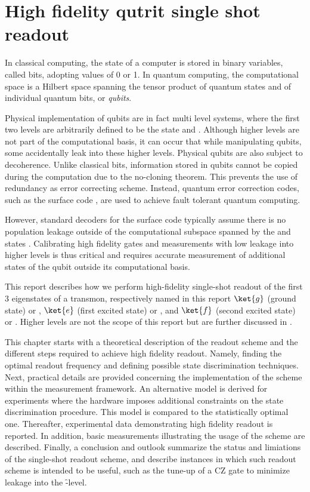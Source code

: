 \chapter{High fidelity qutrit single shot readout} \label{ch:qutrit_readout}
In classical computing, the state of a computer is stored in binary variables, called bits, adopting values of 0 or 1. In quantum computing, the computational space is a Hilbert space spanning the tensor product of quantum states \0 and \1 of individual quantum bits, or \textit{qubits}. 

Physical implementation of qubits are in fact multi level systems, where the first two levels are arbitrarily defined to be the state \0 and \1. Although higher levels are not part of the computational basis, it can occur that while manipulating qubits, some accidentally leak into these higher levels. Physical qubits are also subject to decoherence. Unlike classical bits, information stored in qubits cannot be copied during the computation due to the no-cloning theorem. This prevents the use of redundancy as error correcting scheme. Instead, quantum error correction codes, such as the surface code \cite{Fowler2012SurfaceComputation}, are used to achieve fault tolerant quantum computing. 

However, standard decoders for the surface code typically assume there is no population leakage outside of the computational subspace spanned by the \0 and \1 states  \cite{Ghosh2015}. Calibrating high fidelity gates and measurements with low leakage into higher levels is thus critical \cite{Ghosh2013UnderstandingCircuits} and requires accurate measurement of additional states of the qubit outside its computational basis. 

This report describes how we perform high-fidelity single-shot readout of the first 3 eigenstates of a transmon, respectively named in this report $\ket{g}$ (ground state) or \0, $\ket{e}$ (first excited state) or \1, and $\ket{f}$ (second excited state) or \2. Higher levels are not the scope of this report but are further discussed in \cite{Sank2016Measurement-InducedApproximation, ElderHigh-fidelityCircuits}.

This chapter starts with a theoretical description of the readout scheme and the different steps required to achieve high fidelity readout. Namely, finding the optimal readout frequency and defining  possible state discrimination techniques. Next, practical details are provided concerning the implementation of the scheme within the measurement framework. An alternative model is derived for experiments where the hardware imposes additional constraints on the state discrimination procedure. This model is compared to the statistically optimal one.  Thereafter, experimental data demonstrating high fidelity readout is reported. In addition,  basic measurements illustrating the usage of the scheme are described. Finally, a conclusion and outlook summarize the status and limiations of the single-shot readout scheme, and describe instances in which such readout scheme is intended to be useful, such as the tune-up of a CZ gate to minimize leakage into the \f-level.

